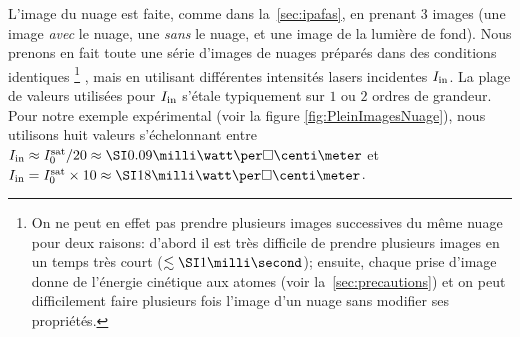 L'image du nuage est faite, comme dans la~\autoref{sec:ipafas}, en prenant 3 images (une image \emph{avec} le nuage, une \emph{sans} le nuage, et une image de la lumière de fond). Nous prenons en fait toute une série d'images de nuages préparés dans des conditions identiques%
%
\footnote{On ne peut en effet pas prendre plusieurs images successives du même nuage pour deux raisons: d'abord il est très difficile de prendre plusieurs images en un temps très court ($\lesssim \ms{1}$);
ensuite, chaque prise d'image donne de l'énergie cinétique aux atomes (voir la~\autoref{sec:precautions}) et on peut difficilement faire plusieurs fois l'image d'un nuage sans modifier ses propriétés.}%
%
, mais en utilisant différentes intensités lasers incidentes ${{I}_{\rm in}}$. La plage de valeurs utilisées pour ${{I}_{\rm in}}$ s'étale typiquement sur $1$ ou $2$ ordres de grandeur. Pour notre exemple expérimental (voir la figure \vref{fig:PleinImagesNuage}), nous utilisons huit valeurs s'échelonnant entre $\Iin \approx \ttfrac{\Isat}{20} \approx \mWpcmc{0.09}$ et  $\Iin = \Isat \times 10 \approx \mWpcmc{18}$.
%
\bfighss
{}\,
\,
\,
\label{fig:PleinImagesNuage}
\efigh

\casse


